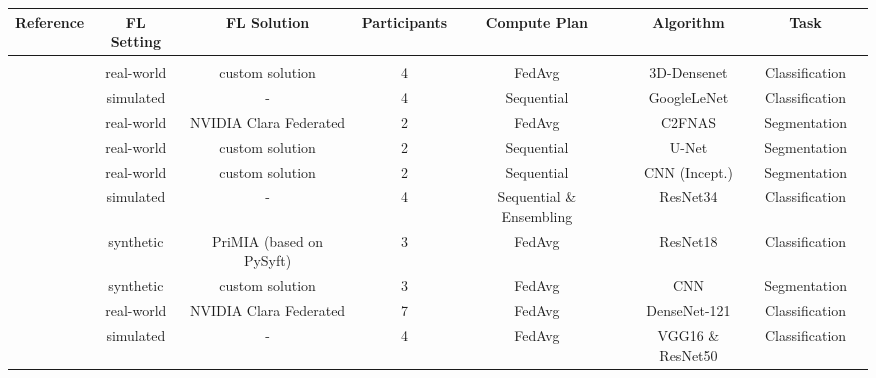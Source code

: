 \begin{table}
\begin{adjustbox}{width=1.0\textheight}
  \centering
  \begin{tabular}{cccccccc}
    Reference & FL Setting & FL Solution & Participants & Compute Plan & Algorithm & Task \\
    \hline \\[-2.5ex] %
    \cite{Xu2020ADiagnosis}                             & real-world & custom solution          & 4             & FedAvg                    & 3D-Densenet       & Classification \\
    \cite{Balachandar2020AccountingImaging}             & simulated  & -                        & 4             & Sequential                & GoogleLeNet       & Classification \\
    \cite{Wang2020AutomatedLearning}                    & real-world & NVIDIA Clara Federated   & 2             & FedAvg                    & C2FNAS            & Segmentation \\
    \cite{Remedios2020DistributedSegmentation}          & real-world & custom solution          & 2             & Sequential                & U-Net             & Segmentation  \\
    \cite{Remedios2019DistributedInjury}                & real-world & custom solution          & 2             & Sequential                & CNN (Incept.)     & Segmentation  \\
    \cite{Chang2018DistributedImaging}                  & simulated  & -                        & 4             & Sequential \& Ensembling  & ResNet34          & Classification \\
    \cite{Kaissis2021End-to-endImaging}                 & synthetic  & PriMIA (based on PySyft) & 3             & FedAvg                    & ResNet18          & Classification  \\
    \cite{Dou2021FederatedStudy}                        & synthetic  & custom solution          & 3             & FedAvg                    & CNN               & Segmentation \\
    \cite{Roth2020FederatedImplementation}              & real-world & NVIDIA Clara Federated   & 7             & FedAvg                    & DenseNet-121      & Classification \\
    \cite{Feki2021FederatedImages}                      & simulated  & -                        & 4             & FedAvg                    & VGG16 \& ResNet50 & Classification \\    

\end{tabular}
\end{adjustbox}
\end{table}
